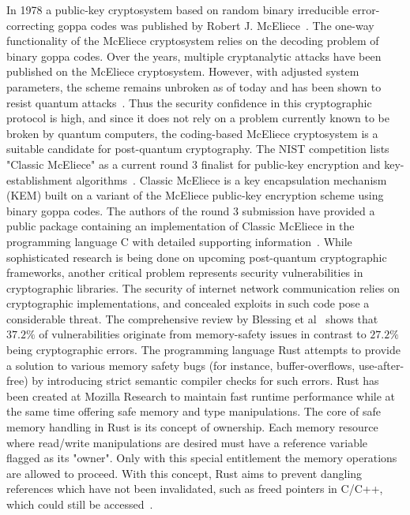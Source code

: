 \documentclass[11pt,
  oneside,openany,    %
]{scrreprt}
\begin{document}
In 1978 a public-key cryptosystem based on random binary irreducible error-correcting goppa codes was published by Robert J. McEliece~\cite{robertmceliece}. The one-way functionality of the McEliece cryptosystem relies on the decoding problem of binary goppa codes. Over the years, multiple cryptanalytic attacks have been published on the McEliece cryptosystem. However, with adjusted system parameters, the scheme remains unbroken as of today and has been shown to resist quantum attacks~\cite{engelbertOverbeckSchmidt, bernsteinLange, DinhMooreRussell}. Thus the security confidence in this cryptographic protocol is high, and since it does not rely on a problem currently known to be broken by quantum computers, the coding-based McEliece cryptosystem is a suitable candidate for post-quantum cryptography. The NIST competition lists "Classic McEliece" as a current round 3 finalist for public-key encryption and key-establishment algorithms~\cite{nistRound2summary}. Classic McEliece is a key encapsulation mechanism (KEM) built on a variant of the McEliece public-key encryption scheme using binary goppa codes.
The authors of the round 3 submission have provided a public package containing an implementation of Classic McEliece in the programming language C with detailed supporting information~\cite{classicMcElieceSubmission3}. While sophisticated research is being done on upcoming post-quantum cryptographic frameworks, another critical problem represents security vulnerabilities in cryptographic libraries. The security of internet network communication relies on cryptographic implementations, and concealed exploits in such code pose a considerable threat. The comprehensive review by Blessing et al~\cite{youShouldNtRollOwnCrypto} shows that $37.2\%$ of vulnerabilities originate from memory-safety issues in contrast to $27.2\%$ being cryptographic errors. The programming language Rust attempts to provide a solution to various memory safety bugs (for instance, buffer-overflows, use-after-free) by introducing strict semantic compiler checks for such errors. Rust has been created at Mozilla Research to maintain fast runtime performance while at the same time offering safe memory and type manipulations. The core of safe memory handling in Rust is its concept of ownership. Each memory resource where read/write manipulations are desired must have a reference variable flagged as its "owner". Only with this special entitlement the memory operations are allowed to proceed. With this concept, Rust aims to prevent dangling references which have not been invalidated, such as freed pointers in C/C++, which could still be accessed~\cite{RustBelt, memsafetyHui}.
\end{document}
